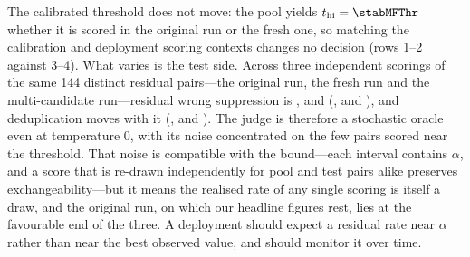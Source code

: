 The calibrated threshold does not move: the pool yields $\thi=\stabMFThr$ whether it is scored in the original run or the fresh one, so matching the calibration and deployment scoring contexts changes no decision (rows 1--2 against 3--4). What varies is the test side. Across three independent scorings of the same 144 distinct residual pairs---the original run, the fresh run and the multi-candidate run---residual wrong suppression is \stabMPWSCount, \stabMFWSCount{} and \stabMTWSCount{} (\stabMPWS, \stabMFWS{} and \stabMTWS), and deduplication moves with it (\stabMPDedup, \stabMFDedup{} and \stabMTDedup). The judge is therefore a stochastic oracle even at temperature 0, with its noise concentrated on the few pairs scored near the threshold. That noise is compatible with the bound---each interval contains $\alpha$, and a score that is re-drawn independently for pool and test pairs alike preserves exchangeability---but it means the realised rate of any single scoring is itself a draw, and the original run, on which our headline figures rest, lies at the favourable end of the three. A deployment should expect a residual rate near $\alpha$ rather than near the best observed value, and should monitor it over time.
